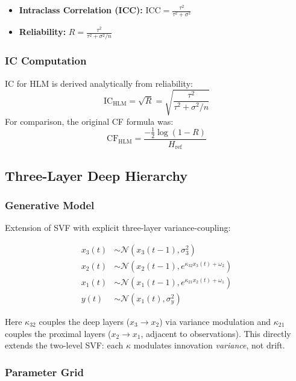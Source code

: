 \documentclass[10pt]{article} %
\theoremstyle{plain}
\theoremstyle{definition}
\newcommand{\IC}{\mathrm{IC}}  %
\begin{document}
\begin{itemize}
\item \textbf{Intraclass Correlation (ICC):} $\text{ICC} = \frac{\tau^2}{\tau^2 + \sigma^2}$
\item \textbf{Reliability:} $R = \frac{\tau^2}{\tau^2 + \sigma^2/n}$
\end{itemize}

\subsubsection{IC Computation}

IC for HLM is derived analytically from reliability:
\begin{equation}
\IC_{\text{HLM}} = \sqrt{R} = \sqrt{\frac{\tau^2}{\tau^2 + \sigma^2/n}}
\end{equation}
For comparison, the original CF formula was:
\begin{equation}
\text{CF}_{\text{HLM}} = \frac{-\frac{1}{2}\log(1 - R)}{H_{\text{ref}}}
\end{equation}

\subsection{Three-Layer Deep Hierarchy}

\subsubsection{Generative Model}

Extension of SVF with explicit three-layer variance-coupling:

\begin{align}
x_3(t) &\sim \mathcal{N}(x_3(t-1), \sigma_3^2) \\
x_2(t) &\sim \mathcal{N}(x_2(t-1), e^{\kappa_{32} x_3(t) + \omega_2}) \\
x_1(t) &\sim \mathcal{N}(x_1(t-1), e^{\kappa_{21} x_2(t) + \omega_1}) \\
y(t) &\sim \mathcal{N}(x_1(t), \sigma_y^2)
\end{align}

Here $\kappa_{32}$ couples the deep layers ($x_3 \to x_2$) via variance modulation 
and $\kappa_{21}$ couples the proximal layers ($x_2 \to x_1$, adjacent to observations).
This directly extends the two-level SVF: each $\kappa$ modulates innovation \emph{variance}, not drift.

\subsubsection{Parameter Grid}
\end{document}
